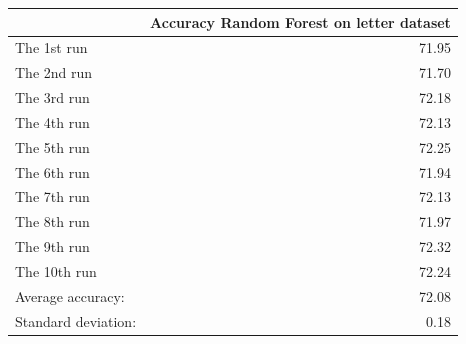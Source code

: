 \begin{tabular}{lr}
\toprule
{} &  Accuracy Random Forest on letter dataset \\
\midrule
The 1st run         &                                     71.95 \\
The 2nd run         &                                     71.70 \\
The 3rd run         &                                     72.18 \\
The 4th run         &                                     72.13 \\
The 5th run         &                                     72.25 \\
The 6th run         &                                     71.94 \\
The 7th run         &                                     72.13 \\
The 8th run         &                                     71.97 \\
The 9th run         &                                     72.32 \\
The 10th run        &                                     72.24 \\
Average accuracy:   &                                     72.08 \\
Standard deviation: &                                      0.18 \\
\bottomrule
\end{tabular}
